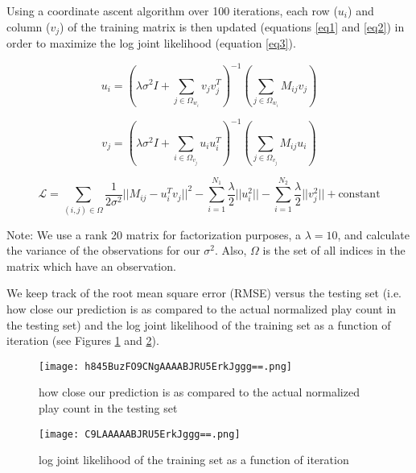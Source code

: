 \documentclass[12pt,preprint]{aastex}
\begin{document}
Using a coordinate ascent algorithm over 100 iterations, each row ($u_i$) and column ($v_j$) of the training matrix is then updated (equations \ref{eq1} and \ref{eq2}) in order to maximize the log joint likelihood (equation \ref{eq3}). 

\begin{equation}
u_i = \left( \lambda\sigma^2 I + \sum_{j \in \Omega_{w_i}} v_j v_j^T \right)^{-1}\left(\sum_{j \in \Omega_{w_i}} M_{ij} v_{j} \right)
\label{eq1}
\end{equation}


\begin{equation}
v_j = \left( \lambda\sigma^2 I + \sum_{i \in \Omega_{v_j}} u_i u_i^T \right)^{-1}\left(\sum_{j \in \Omega_{v_j}} M_{ij} u_{i} \right)
\label{eq2}
\end{equation}


\begin{equation}
\mathcal{L} = \sum_{(i,j) \in \Omega} \frac{1}{2\sigma^2} {|| M_{ij} - u_i^T v_j||}^2 - \sum_{i=1}^{N_1} \frac{\lambda}{2} ||u_i^2 || - \sum_{i=1}^{N_2} \frac{\lambda}{2} ||v_j^2 || + \text{constant}
\label{eq3} 
\end{equation}

Note: We use a rank 20 matrix for factorization purposes, a $\lambda = 10$, and calculate the variance of the observations for our $\sigma^2$. Also, $\Omega$ is the set of all indices in the matrix which have an observation.

We keep track of the root mean square error (RMSE) versus the testing set (i.e. how close our prediction is as compared to the actual normalized play count in the testing set) and the log joint likelihood of the training set as a function of iteration (see Figures \ref{fig:rmseplot} and \ref{fig:likeplot}).


\begin{figure}[htbp] %
   \centering
   \texttt{[image: h845BuzFO9CNgAAAABJRU5ErkJggg==.png]} 
   \caption{how close our prediction is as compared to the actual normalized play count in the testing set }
   \label{fig:rmseplot}
\end{figure}

\begin{figure}[htbp] %
   \centering
   \texttt{[image: C9LAAAAABJRU5ErkJggg==.png]} 
   \caption{log joint likelihood of the training set as a function of iteration }
   \label{fig:likeplot}
\end{figure}
\end{document}
